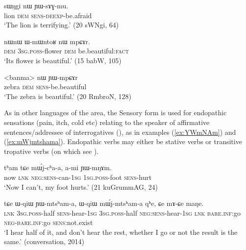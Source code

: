 \documentclass[oldfontcommands,oneside,a4paper,11pt]{article}
\newcommand{\ipa}[1]{{\phon \mbox{#1}}} %
\newcommand{\refb}[1]{(\ref{#1})}
\newcommand{\factual}[1]{\textsc{:fact}}
\begin{document}
\begin{exe}
\ex \label{ex:YWsAGmu}
\gll 
\ipa{sɯŋgi}  	\ipa{nɯ}  	\ipa{ɲɯ-sɤɣ-mu.}  \\
lion \textsc{dem} \textsc{sens-deexp}-be.afraid \\
\glt `The lion is terrifying.' (20 sWNgi, 64)
\end{exe}


\begin{exe}
\ex \label{ex:mpCAr}
\gll
\ipa{nɯnɯ}  	\ipa{ɯ-mɯntoʁ}  	\ipa{nɯ}  	\ipa{mpɕɤr.}  \\
\textsc{dem} \textsc{3sg.poss}-flower \textsc{dem} be.beautiful\factual{} \\
\glt `Its flower is beautiful.' (15 babW, 105)
\end{exe}


\begin{exe}
\ex \label{ex:YWmpCAr}
\gll 
<banma> 	\ipa{nɯ}  	\ipa{ɲɯ-mpɕɤr}  \\
zebra \textsc{dem} \textsc{sens}-be.beautiful \\
\glt `The zebra is beautiful.' (20 RmbroN, 128)
\end{exe}

As in other languages of the area, the Sensory form is used for endopathic sensations (pain, itch, cold etc)  relating to the speaker of affirmative sentences/addressee of interrogatives (\citealt{tournadre14evidentiality}), as in examples \refb{ex:YWmNAm} and \refb{ex:mWjmtshama}. Endopathic verbs may either be stative verbs or transitive tropative verbs (on which see \citealt{jacques13tropative}).

\begin{exe}
\ex \label{ex:YWmNAm}
\gll
\ipa{tʰam} 	\ipa{tɕe} 	\ipa{mɯ́j-cʰa-a,} 	\ipa{a-mi} 	\ipa{ɲɯ-mŋɤm.} \\
now \textsc{lnk} \textsc{neg:sens}-can-\textsc{1sg} \textsc{1sg.poss}-foot \textsc{sens}-hurt \\
\glt `Now I can't, my foot hurts.' (21 kuGrummAG, 24)
\end{exe}

\begin{exe}
\ex \label{ex:mWjmtshama}
\gll
\ipa{tɕe} 	\ipa{ɯ-qiɯ} 	\ipa{ɲɯ-mtsʰam-a,} 	\ipa{ɯ-qiɯ} 	\ipa{mɯ́j-mtsʰam-a} 	\ipa{qʰe,} 	\ipa{ɕe} 	\ipa{mɤ-ɕe} 	\ipa{maŋe.} \\
\textsc{lnk} \textsc{3sg.poss}-half \textsc{sens}-hear-\textsc{1sg}   \textsc{3sg.poss}-half \textsc{neg:sens}-hear-\textsc{1sg}  \textsc{lnk}  \textsc{bare.inf}:go \textsc{neg}-\textsc{bare.inf}:go \textsc{sens}:not.exist \\
\glt `I hear half of it, and don't hear the rest, whether I go or not the result is the same.' (conversation, 2014)
\end{exe}
\end{document}
